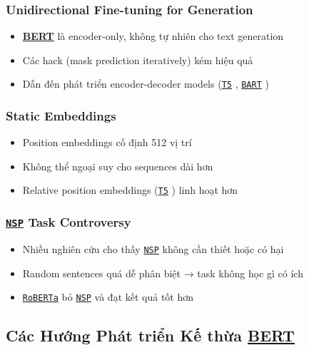 \subsubsection{Unidirectional Fine-tuning for Generation}
\begin{itemize}
    \item \hyperref[acro:bert]{\textbf{BERT}} là encoder-only, không tự nhiên cho text generation
    \item Các hack (mask prediction iteratively) kém hiệu quả
    \item Dẫn đến phát triển encoder-decoder models (\hyperref[acro:t5]{\texttt{T5}} \cite{raffel2020exploring}, \hyperref[acro:bart]{\texttt{BART}} \cite{lewis2019bart})
\end{itemize}

\subsubsection{Static Embeddings}
\begin{itemize}
    \item Position embeddings cố định 512 vị trí
    \item Không thể ngoại suy cho sequences dài hơn
    \item Relative position embeddings (\hyperref[acro:t5]{\texttt{T5}} \cite{raffel2020exploring}) linh hoạt hơn
\end{itemize}

\subsubsection{\hyperref[acro:nsp]{\texttt{NSP}} Task Controversy}
\begin{itemize}
    \item Nhiều nghiên cứu cho thấy \hyperref[acro:nsp]{\texttt{NSP}} không cần thiết hoặc có hại \cite{liu2019roberta}
    \item Random sentences quá dễ phân biệt → task không học gì có ích
    \item \hyperref[acro:roberta]{\texttt{RoBERTa}} \cite{liu2019roberta} bỏ \hyperref[acro:nsp]{\texttt{NSP}} và đạt kết quả tốt hơn
\end{itemize}

\subsection{Các Hướng Phát triển Kế thừa \hyperref[acro:bert]{\textbf{BERT}}}
\label{ssec:huong_phat_trien_ke_thua}

